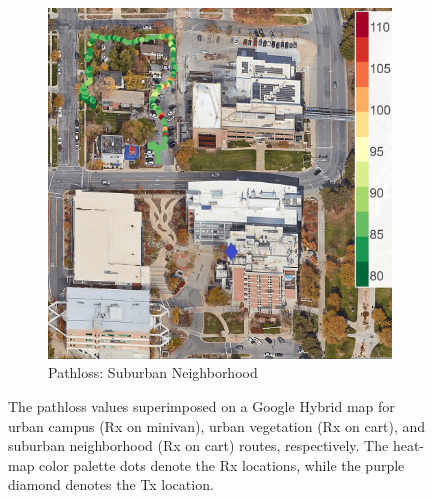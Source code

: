 \documentclass[10pt, twocolumn]{IEEEtran}
\begin{document}
\begin{figure} [t]
     \begin{subfigure}{0.245\linewidth}
         \centering
         \includegraphics[width=1.0\linewidth]{figs/pl_suburban_fraternities.jpg}
         \caption{Pathloss: Suburban Neighborhood}
         \label{F5c}
     \end{subfigure}
     \vspace{-2mm}
     \caption{The pathloss values superimposed on a Google Hybrid map for urban campus (Rx on minivan), urban vegetation (Rx on cart), and suburban neighborhood (Rx on cart) routes, respectively. The heat-map color palette dots denote the Rx locations, while the purple diamond denotes the Tx location.}
     \label{F5}
     \vspace{-7mm}
\end{figure}
\end{document}
